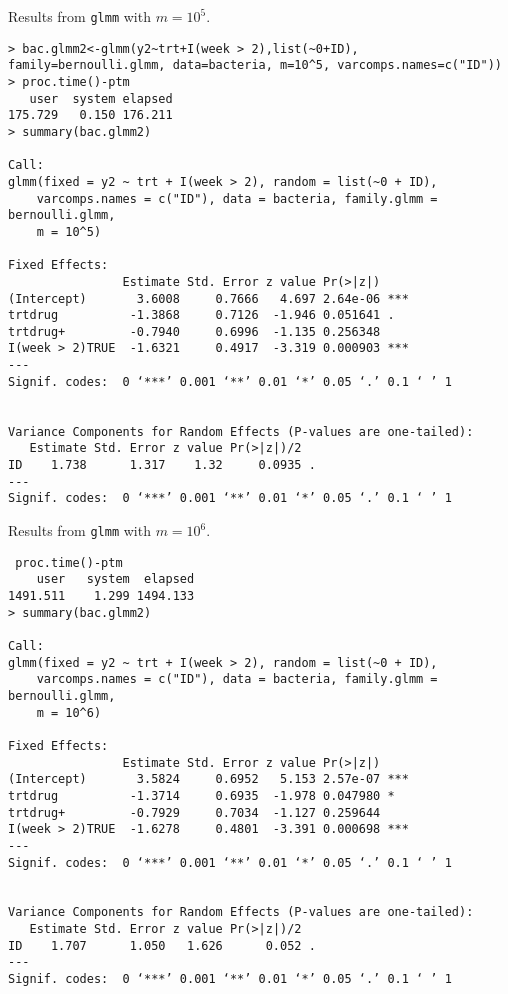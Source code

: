 \documentclass{article}
\begin{document}
Results from  \texttt{glmm}  with $m=10^5$.
\begin{verbatim}
> bac.glmm2<-glmm(y2~trt+I(week > 2),list(~0+ID), family=bernoulli.glmm, data=bacteria, m=10^5, varcomps.names=c("ID"))
> proc.time()-ptm
   user  system elapsed 
175.729   0.150 176.211 
> summary(bac.glmm2)

Call:
glmm(fixed = y2 ~ trt + I(week > 2), random = list(~0 + ID), 
    varcomps.names = c("ID"), data = bacteria, family.glmm = bernoulli.glmm, 
    m = 10^5)

Fixed Effects:
                Estimate Std. Error z value Pr(>|z|)    
(Intercept)       3.6008     0.7666   4.697 2.64e-06 ***
trtdrug          -1.3868     0.7126  -1.946 0.051641 .  
trtdrug+         -0.7940     0.6996  -1.135 0.256348    
I(week > 2)TRUE  -1.6321     0.4917  -3.319 0.000903 ***
---
Signif. codes:  0 ‘***’ 0.001 ‘**’ 0.01 ‘*’ 0.05 ‘.’ 0.1 ‘ ’ 1


Variance Components for Random Effects (P-values are one-tailed):
   Estimate Std. Error z value Pr(>|z|)/2  
ID    1.738      1.317    1.32     0.0935 .
---
Signif. codes:  0 ‘***’ 0.001 ‘**’ 0.01 ‘*’ 0.05 ‘.’ 0.1 ‘ ’ 1

\end{verbatim}

Results from \texttt{glmm} with $m=10^6$.
\begin{verbatim}
 proc.time()-ptm
    user   system  elapsed 
1491.511    1.299 1494.133 
> summary(bac.glmm2)

Call:
glmm(fixed = y2 ~ trt + I(week > 2), random = list(~0 + ID), 
    varcomps.names = c("ID"), data = bacteria, family.glmm = bernoulli.glmm, 
    m = 10^6)

Fixed Effects:
                Estimate Std. Error z value Pr(>|z|)    
(Intercept)       3.5824     0.6952   5.153 2.57e-07 ***
trtdrug          -1.3714     0.6935  -1.978 0.047980 *  
trtdrug+         -0.7929     0.7034  -1.127 0.259644    
I(week > 2)TRUE  -1.6278     0.4801  -3.391 0.000698 ***
---
Signif. codes:  0 ‘***’ 0.001 ‘**’ 0.01 ‘*’ 0.05 ‘.’ 0.1 ‘ ’ 1


Variance Components for Random Effects (P-values are one-tailed):
   Estimate Std. Error z value Pr(>|z|)/2  
ID    1.707      1.050   1.626      0.052 .
---
Signif. codes:  0 ‘***’ 0.001 ‘**’ 0.01 ‘*’ 0.05 ‘.’ 0.1 ‘ ’ 1
\end{verbatim}
\end{document}
